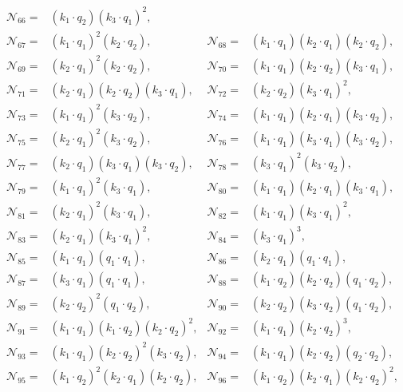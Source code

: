 \documentclass[twocolumn,aps,showpacs,nofootinbib,superscriptaddress,prd]{revtex4-2}
\begin{document}
\begin{widetext}
\begin{align}
{\mathcal N}_{66}=&(k_1\cdot q_2) (k_3\cdot q_1)^2,\nonumber\\
{\mathcal N}_{67}=&(k_1\cdot q_1)^2 (k_2\cdot q_2),&
{\mathcal N}_{68}=&(k_1\cdot q_1) (k_2\cdot q_1) (k_2\cdot q_2),\nonumber\\
{\mathcal N}_{69}=&(k_2\cdot q_1)^2 (k_2\cdot q_2),&
{\mathcal N}_{70}=&(k_1\cdot q_1) (k_2\cdot q_2) (k_3\cdot q_1),\nonumber\\
{\mathcal N}_{71}=&(k_2\cdot q_1) (k_2\cdot q_2) (k_3\cdot q_1),&
{\mathcal N}_{72}=&(k_2\cdot q_2) (k_3\cdot q_1)^2,\nonumber\\
{\mathcal N}_{73}=&(k_1\cdot q_1)^2 (k_3\cdot q_2),&
{\mathcal N}_{74}=&(k_1\cdot q_1) (k_2\cdot q_1) (k_3\cdot q_2),\nonumber\\
{\mathcal N}_{75}=&(k_2\cdot q_1)^2 (k_3\cdot q_2),&
{\mathcal N}_{76}=&(k_1\cdot q_1) (k_3\cdot q_1) (k_3\cdot q_2),\nonumber\\
{\mathcal N}_{77}=&(k_2\cdot q_1) (k_3\cdot q_1) (k_3\cdot q_2),&
{\mathcal N}_{78}=&(k_3\cdot q_1)^2 (k_3\cdot q_2),\nonumber\\
{\mathcal N}_{79}=&(k_1\cdot q_1)^2 (k_3\cdot q_1),&
{\mathcal N}_{80}=&(k_1\cdot q_1) (k_2\cdot q_1) (k_3\cdot q_1),\nonumber\\
{\mathcal N}_{81}=&(k_2\cdot q_1)^2 (k_3\cdot q_1),&
{\mathcal N}_{82}=&(k_1\cdot q_1) (k_3\cdot q_1)^2,\nonumber\\
{\mathcal N}_{83}=&(k_2\cdot q_1) (k_3\cdot q_1)^2,&
{\mathcal N}_{84}=&(k_3\cdot q_1)^3,\nonumber\\
{\mathcal N}_{85}=&(k_1\cdot q_1) (q_1\cdot q_1),&
{\mathcal N}_{86}=&(k_2\cdot q_1) (q_1\cdot q_1),\nonumber\\
{\mathcal N}_{87}=&(k_3\cdot q_1) (q_1\cdot q_1),&
{\mathcal N}_{88}=&(k_1\cdot q_2) (k_2\cdot q_2) (q_1\cdot q_2),\nonumber\\
{\mathcal N}_{89}=&(k_2\cdot q_2)^2 (q_1\cdot q_2),&
{\mathcal N}_{90}=&(k_2\cdot q_2) (k_3\cdot q_2) (q_1\cdot q_2),\nonumber\\
{\mathcal N}_{91}=&(k_1\cdot q_1) (k_1\cdot q_2) (k_2\cdot q_2)^2,&
{\mathcal N}_{92}=&(k_1\cdot q_1) (k_2\cdot q_2)^3,\nonumber\\
{\mathcal N}_{93}=&(k_1\cdot q_1) (k_2\cdot q_2)^2 (k_3\cdot q_2),&
{\mathcal N}_{94}=&(k_1\cdot q_1) (k_2\cdot q_2) (q_2\cdot q_2),\nonumber\\
{\mathcal N}_{95}=&(k_1\cdot q_2)^2 (k_2\cdot q_1) (k_2\cdot q_2),&
{\mathcal N}_{96}=&(k_1\cdot q_2) (k_2\cdot q_1) (k_2\cdot q_2)^2,\nonumber\\

\end{align}
\end{widetext}
\end{document}
